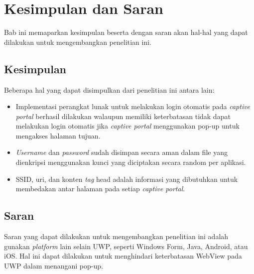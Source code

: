 \chapter{Kesimpulan dan Saran}
\label{chap:kesimpulan_dan_saran}

Bab ini memaparkan kesimpulan beserta dengan saran akan hal-hal yang dapat dilakukan untuk mengembangkan penelitian ini.



\section{Kesimpulan}
\label{sec:kesimpulan}

Beberapa hal yang dapat disimpulkan dari penelitian ini antara lain:

\begin{itemize}
    \item{Implementasi perangkat lunak untuk melakukan login otomatis pada \textit{captive portal} berhasil dilakukan walaupun memiliki keterbatasan tidak dapat melakukan login otomatis jika \textit{captive portal} menggunakan pop-up untuk mengakses halaman tujuan.}
    \item{\textit{Username} dan \textit{password} sudah disimpan secara aman dalam file yang dienkripsi menggunakan kunci yang diciptakan secara random per aplikasi.}
    \item{SSID, uri, dan konten \textit{tag} head adalah informasi yang dibutuhkan untuk membedakan antar halaman pada setiap \textit{captive portal}.}
\end{itemize}



\section{Saran}
\label{sec:saran}

Saran yang dapat dilakukan untuk mengembangkan penelitian ini adalah gunakan \textit{platform} lain selain UWP, seperti Windows Form, Java, Android, atau iOS. Hal ini dapat dilakukan untuk menghindari keterbatasan WebView pada UWP dalam menangani pop-up.